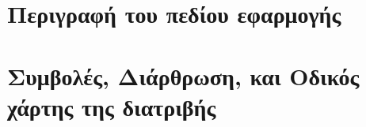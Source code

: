 \chapter{Περιγραφή του πεδίου εφαρμογής}


\chapter{Συμβολές, Διάρθρωση, και Οδικός χάρτης της διατριβής}

